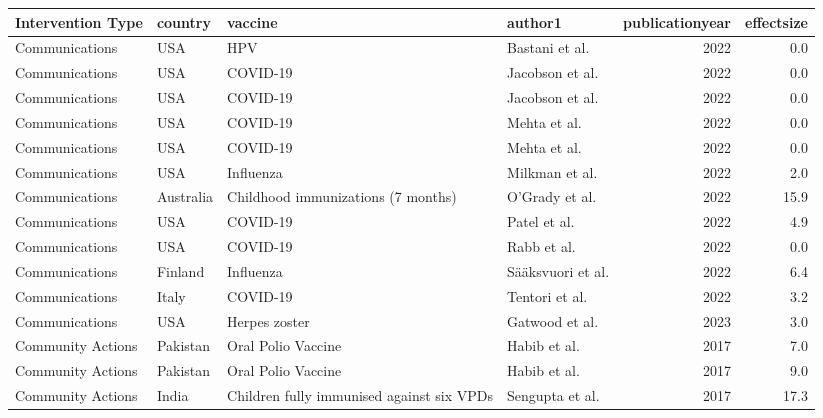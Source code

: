 
\begin{tabular}{llllrr}
\toprule
Intervention Type & country & vaccine & author1 & publicationyear & effectsize\\
\midrule
Communications & USA & HPV & Bastani et al. & 2022 & 0.0\\
Communications & USA & COVID-19 & Jacobson et al. & 2022 & 0.0\\
Communications & USA & COVID-19 & Jacobson et al. & 2022 & 0.0\\
Communications & USA & COVID-19 & Mehta et al. & 2022 & 0.0\\
Communications & USA & COVID-19 & Mehta et al. & 2022 & 0.0\\
\addlinespace
Communications & USA & Influenza & Milkman et al. & 2022 & 2.0\\
Communications & Australia & Childhood immunizations (7 months) & O'Grady et al. & 2022 & 15.9\\
Communications & USA & COVID-19 & Patel et al. & 2022 & 4.9\\
Communications & USA & COVID-19 & Rabb et al. & 2022 & 0.0\\
Communications & Finland & Influenza & Sääksvuori et al. & 2022 & 6.4\\
\addlinespace
Communications & Italy & COVID-19 & Tentori et al. & 2022 & 3.2\\
Communications & USA & Herpes zoster & Gatwood et al. & 2023 & 3.0\\
Community Actions & Pakistan & Oral Polio Vaccine & Habib et al. & 2017 & 7.0\\
Community Actions & Pakistan & Oral Polio Vaccine & Habib et al. & 2017 & 9.0\\
Community Actions & India & Children fully immunised against six VPDs & Sengupta et al. & 2017 & 17.3\\
\bottomrule
\end{tabular}
